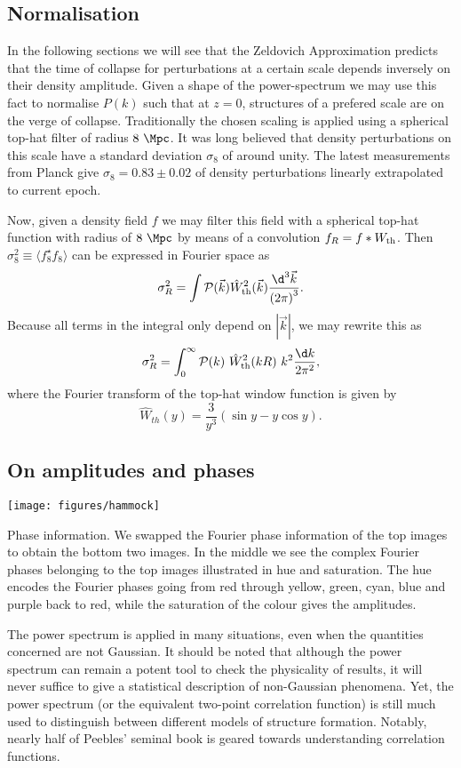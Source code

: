 \begin{subappendices}
\subsection{Normalisation}
In the following sections we will see that the Zeldovich Approximation predicts that the time of collapse for perturbations at a certain scale depends inversely on their density amplitude. Given a shape of the power-spectrum we may use this fact to normalise $P(k)$ such that at $z=0$, structures of a prefered scale are on the verge of collapse. Traditionally the chosen scaling is applied using a spherical top-hat filter of radius $8\ \Mpc$. It was long believed that density perturbations on this scale have a standard deviation $\sigma_8$ of around unity. The latest measurements from Planck \citep{Planck2013-cosmo} give $\sigma_8 = 0.83 \pm 0.02$ of density perturbations linearly extrapolated to current epoch.

Now, given a density field $f$ we may filter this field with a spherical top-hat function with radius of $8\ \Mpc$ by means of a convolution $f_R = f \ast W_{\rm th}$. Then $\sigma_8^2 \equiv \langle f_8^{\star}f_8 \rangle$ can be expressed in Fourier space as
\[\sigma_R^2 = \int \mathcal{P}(\vec{k}) \hat{W}_{\rm th}^2(\vec{k}) \frac{\d^3 \vec{k}}{{(2\pi)}^3}.\]
Because all terms in the integral only depend on $|\vec{k}|$, we may rewrite this as
\[\sigma_R^2 = \int_0^{\infty} \mathcal{P}(k)\ \hat{W}_{\rm th}^2(k R)\ k^2 \frac{\d k}{2 \pi^2},\]
where the Fourier transform of the top-hat window function is given by
\[\hat{W}_{th}(y) = \frac{3}{y^3}\left(\sin y - y \cos y\right).\]

\subsection{On amplitudes and phases}
\begin{FPfigure}
  \texttt{[image: figures/hammock]}
  \caption{Phase information. We swapped the Fourier phase information of the top images to obtain the bottom two images. In the middle we see the complex Fourier phases belonging to the top images illustrated in hue and saturation. The hue encodes the Fourier phases going from red through yellow, green, cyan, blue and purple back to red, while the saturation of the colour gives the amplitudes.}\label{fig:hammock}
\end{FPfigure}
The power spectrum is applied in many situations, even when the quantities concerned are not Gaussian. It should be noted that although the power spectrum can remain a potent tool to check the physicality of results, it will never suffice to give a statistical description of non-Gaussian phenomena. Yet, the power spectrum (or the equivalent two-point correlation function) is still much used to distinguish between different models of structure formation. Notably, nearly half of Peebles' seminal book is geared towards understanding correlation functions.


\end{subappendices}
